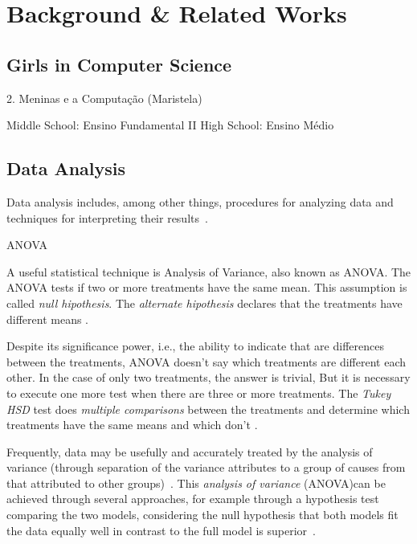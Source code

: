\section{Background \& Related Works}\label{sec:background}%

\subsection{Girls in Computer Science}\label{subsec:background:girls}%
2. Meninas e a Computação (Maristela)

Middle School: Ensino Fundamental II
High School: Ensino Médio

\subsection{Data Analysis}\label{subsec:background:data}%

Data analysis includes, among other things, procedures for analyzing data and techniques for interpreting their results~\cite{Tukey1962}.

%
ANOVA ~\cite{Hastie2009}

A useful statistical technique is Analysis of Variance, also known as ANOVA. The ANOVA tests if two or more treatments have the same mean. This assumption is called \emph{null hipothesis}. The \emph{alternate hipothesis} declares that the treatments have different means \cite{Vieira2006}.

Despite its significance power, i.e., the ability to indicate that are differences between the treatments, ANOVA doesn't say which treatments are different each other. In the case of only two treatments, the answer is trivial, But it is necessary to execute one more test when there are three or more treatments. The \emph{Tukey HSD} test does \emph{multiple comparisons} between the treatments and determine which treatments have the same means and which don't \cite{moore2009practice}.

Frequently, data may be usefully and accurately treated by the analysis of variance (through separation of the variance attributes to a group of causes from that attributed to other groups)~\cite{Fisher1934}. This \emph{analysis of variance} (ANOVA)can be achieved through several approaches, for example through a hypothesis test comparing the two models, considering the null hypothesis that both models fit the data equally well in contrast to  the full model is superior~\cite{James2013}.

